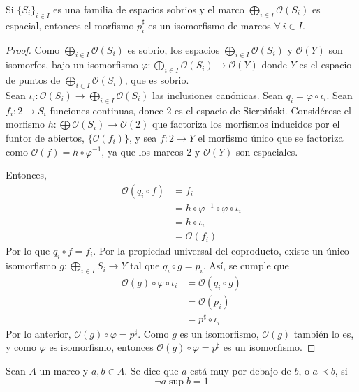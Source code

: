 \begin{prop}
Si $\{S_i\}_{i\in I}$ es una familia de espacios sobrios y el marco $\bigoplus\limits_{i\in I}\mathcal{O}(S_i)$ es espacial, entonces el morfismo $p_i^{\sharp}$ es un isomorfismo de marcos $\forall \ i \in I$.
\end{prop}
\begin{proof}
Como $\bigoplus\limits_{i\in I}\mathcal{O}(S_i)$ es sobrio, los espacios $\bigoplus\limits_{i\in I}\mathcal{O}(S_i)$ y $\mathcal{O}(Y)$ son isomorfos, bajo un isomorfismo $\varphi:\bigoplus\limits_{i\in I}\mathcal{O}(S_i)\to\mathcal{O}(Y)$ donde  $Y$ es el espacio de puntos de $\bigoplus\limits_{i\in I}\mathcal{O}(S_i)$, que es sobrio.\\
Sean $\iota_i: \mathcal{O}(S_i)\to \bigoplus\limits_{i\in I}\mathcal{O}(S_i)$ las inclusiones canónicas. Sean $q_i=\varphi\circ\iota_i$. Sean $f_i:2\to S_i$ funciones continuas, donce $2$ es el espacio de Sierpi\'nski. Considérese el morfismo $h:\bigoplus\mathcal{O}(S_i)\to\mathcal{O}(2)$ que factoriza los morfismos inducidos por el funtor de abiertos, $\{\mathcal{O}(f_i)\}$, y sea $f:2\to Y$ el morfismo único que se factoriza como $\mathcal{O}(f)=h\circ\varphi^{-1}$, ya que los marcos $2$ y $\mathcal{O}(Y)$ son espaciales.

Entonces, \begin{align*}
    \mathcal{O}(q_i\circ f)&=f_i\\
    &=h\circ\varphi^{-1}\circ\varphi\circ\iota_i\\
    &=h\circ\iota_i\\
    &=\mathcal{O}(f_i)
\end{align*}
Por lo que $q_i\circ f=f_i$. Por la propiedad universal del coproducto, existe un único isomorfismo $g:\bigoplus\limits_{i\in I}S_i\to Y$ tal que $q_i\circ g=p_i$. Así, se cumple que 
\begin{align*}
    \mathcal{O}(g)\circ\varphi\circ\iota_i&=\mathcal{O}(q_i\circ g)\\
    &=\mathcal{O}(p_i)\\
    &=p^\sharp\circ\iota_i
\end{align*}
Por lo anterior, $\mathcal{O}(g)\circ\varphi=p^\sharp$. Como $g$ es un isomorfismo, $\mathcal{O}(g)$ también lo es, y como $\varphi$ es isomorfismo, entonces $\mathcal{O}(g)\circ\varphi=p^\sharp$ es un isomorfismo.
\end{proof}
\begin{defn}
    Sean $A$ un marco y $a,b\in A$. Se dice que $a$ está muy por debajo de $b$, o $a\prec b$, si 
    $$\neg a\sup b=1$$
\end{defn}
